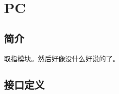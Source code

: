 \documentclass{article}
\begin{document}
\maketitle

\tableofcontents
\newpage

\section{PC\label{sec:PC}}

\subsection{简介}

取指模块。然后好像没什么好说的了。

\FloatBarrier
\subsection{接口定义}
\end{document}
